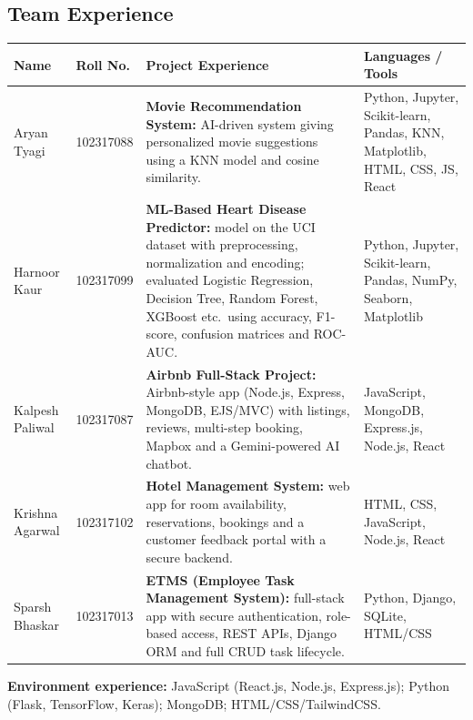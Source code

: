 \documentclass[11pt,a4paper]{report}
\begin{document}
\subsection*{Team Experience}
\small
\begin{longtable}{|p{2.3cm}|p{2.0cm}|p{6.0cm}|p{4.2cm}|}
\hline \textbf{Name} & \textbf{Roll No.} & \textbf{Project Experience} & \textbf{Languages / Tools}\\\hline\endhead
Aryan Tyagi & 102317088 & \textbf{Movie Recommendation System:} AI-driven system giving personalized movie suggestions using a KNN model and cosine similarity. & Python, Jupyter, Scikit-learn, Pandas, KNN, Matplotlib, HTML, CSS, JS, React\\\hline
Harnoor Kaur & 102317099 & \textbf{ML-Based Heart Disease Predictor:} model on the UCI dataset with preprocessing, normalization and encoding; evaluated Logistic Regression, Decision Tree, Random Forest, XGBoost etc.\ using accuracy, F1-score, confusion matrices and ROC-AUC. & Python, Jupyter, Scikit-learn, Pandas, NumPy, Seaborn, Matplotlib\\\hline
Kalpesh Paliwal & 102317087 & \textbf{Airbnb Full-Stack Project:} Airbnb-style app (Node.js, Express, MongoDB, EJS/MVC) with listings, reviews, multi-step booking, Mapbox and a Gemini-powered AI chatbot. & JavaScript, MongoDB, Express.js, Node.js, React\\\hline
Krishna Agarwal & 102317102 & \textbf{Hotel Management System:} web app for room availability, reservations, bookings and a customer feedback portal with a secure backend. & HTML, CSS, JavaScript, Node.js, React\\\hline
Sparsh Bhaskar & 102317013 & \textbf{ETMS (Employee Task Management System):} full-stack app with secure authentication, role-based access, REST APIs, Django ORM and full CRUD task lifecycle. & Python, Django, SQLite, HTML/CSS\\\hline
\end{longtable}
\normalsize

\textbf{Environment experience:} JavaScript (React.js, Node.js, Express.js); Python (Flask, TensorFlow, Keras); MongoDB; HTML/CSS/TailwindCSS.
\end{document}
